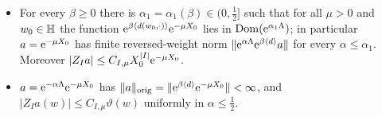 \begin{lemma}\label{cl:amp}
\begin{itemize}
\item[\textup{(i)}] For every $\beta\ge0$ there is $\alpha_1=\alpha_1(\beta)\in(0,\tfrac12]$ such that for all $\mu>0$ and $w_0\in\mathbb{H}$ the function
$\mathrm{e}^{\beta\langle d(w_0,\cdot)\rangle}\mathrm{e}^{-\mu X_0}$ lies in $\operatorname{Dom}(\mathrm{e}^{\alpha_1\Lambda})$; in particular $a=\mathrm{e}^{-\mu X_0}$ has finite reversed-weight norm
$\lVert \mathrm{e}^{\alpha\Lambda}\mathrm{e}^{\beta\langle d\rangle}a\rVert$ for every $\alpha\le\alpha_1$. Moreover $|Z_Ia|\le C_{I,\mu}X_0^{|I|}\mathrm{e}^{-\mu X_0}$.
\item[\textup{(ii)}] $a=\mathrm{e}^{-\alpha\Lambda}\mathrm{e}^{-\mu X_0}$ has $\lVert a\rVert_{\mathrm{orig}}=\lVert \mathrm{e}^{\beta\langle d\rangle}\mathrm{e}^{-\mu X_0}\rVert<\infty$, and
$|Z_Ia(w)|\le C_{I,\mu}\vartheta(w)$ uniformly in $\alpha\le\tfrac12$.
\end{itemize}
\end{lemma}
